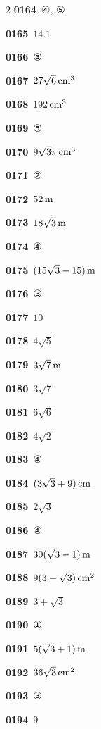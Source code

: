 \documentclass[10pt,a4paper]{article}
\begin{document}
\begin{multicols}{2}
\noindent\textbf{0164}\ ④, ⑤\par
\noindent\textbf{0165}\ $14.1$\par
\noindent\textbf{0166}\ ③\par
\noindent\textbf{0167}\ $27\sqrt{6}\mkern3mu \mathrm{cm}^3$\par
\noindent\textbf{0168}\ $192\mkern3mu \mathrm{cm}^3$\par
\noindent\textbf{0169}\ ⑤\par
\noindent\textbf{0170}\ $9\sqrt{3}\pi\mkern3mu \mathrm{cm}^3$\par
\noindent\textbf{0171}\ ②\par
\noindent\textbf{0172}\ $52\mkern3mu \mathrm{m}$\par
\noindent\textbf{0173}\ $18\sqrt{3}\mkern3mu \mathrm{m}$\par
\noindent\textbf{0174}\ ④\par
\noindent\textbf{0175}\ $(15\sqrt{3}-15)\mkern3mu \mathrm{m}$\par
\noindent\textbf{0176}\ ③\par
\noindent\textbf{0177}\ $10$\par
\noindent\textbf{0178}\ $4\sqrt{5}$\par
\noindent\textbf{0179}\ $3\sqrt{7}\mkern3mu \mathrm{m}$\par
\noindent\textbf{0180}\ $3\sqrt{7}$\par
\noindent\textbf{0181}\ $6\sqrt{6}$\par
\noindent\textbf{0182}\ $4\sqrt{2}$\par
\noindent\textbf{0183}\ ④\par
\noindent\textbf{0184}\ $(3\sqrt{3}+9)\mkern3mu \mathrm{cm}$\par
\noindent\textbf{0185}\ $2\sqrt{3}$\par
\noindent\textbf{0186}\ ④\par
\noindent\textbf{0187}\ $30(\sqrt{3}-1)\mkern3mu \mathrm{m}$\par
\noindent\textbf{0188}\ $9(3-\sqrt{3})\mkern3mu \mathrm{cm}^2$\par
\noindent\textbf{0189}\ $3+\sqrt{3}$\par
\noindent\textbf{0190}\ ①\par
\noindent\textbf{0191}\ $5(\sqrt{3}+1)\mkern3mu \mathrm{m}$\par
\noindent\textbf{0192}\ $36\sqrt{3}\mkern3mu \mathrm{cm}^2$\par
\noindent\textbf{0193}\ ③\par
\noindent\textbf{0194}\ $9$\par

\end{multicols}
\end{document}
